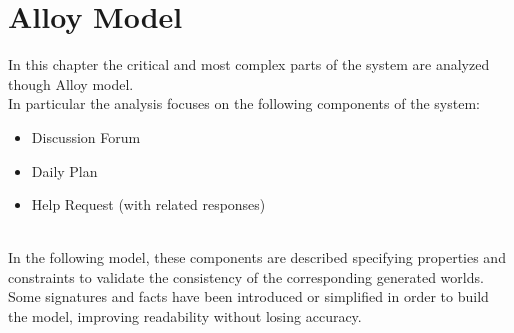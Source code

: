 \section{Alloy Model}

In this chapter the critical and most complex parts of the system are analyzed though Alloy model.\\
In particular the analysis focuses on the following components of the system: 
\begin{itemize}
    \item Discussion Forum
    \item Daily Plan
    \item Help Request (with related responses)
\end{itemize} \\
In the following model, these components are described specifying properties and constraints to validate the consistency of the corresponding generated worlds.\\
Some signatures and facts have been introduced or simplified in order to build the model, improving readability without losing accuracy.







